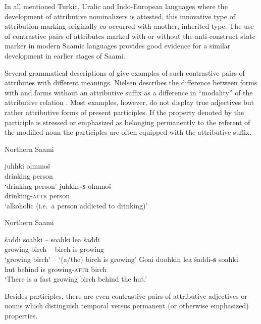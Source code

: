 {In all mentioned Turkic, Uralic and Indo-European languages where the development of attributive nominalizers is attested, this innovative type of attribution marking originally co-occurred with another, inherited type. The use of contrastive pairs of attributes marked with or without the anti-construct state marker in modern Saamic languages provides good evidence for a similar development in earlier stages of Saami.

Several grammatical descriptions of  give examples of such contrastive pairs of attributes with different meanings. Nielsen describes the difference between forms with and forms without an attributive suffix as a difference in “modality” of the attributive relation \cite[203]{nielsen1945b}. Most examples, however, do not display true adjectives but rather attributive forms of present participles. If the property denoted by the participle is stressed or emphasized as belonging permanently to the referent of the modified noun the participles are often equipped with the attributive suffix.
\begin{exe}
\ex
\begin{xlist}
\ex \rm{Northern Saami \citep[204]{nielsen1945b}}
\begin{xlist}
\ex
\gll 	juhhki olmmoš\\
	drinking person\\
\glt	 ‘drinking person’
\ex	
\gll	juhkke\textbf{-s} olmmoš\\
	drinking-\textsc{attr} person\\
\glt	‘alkoholic (i.e.~a person addicted to drinking)’
\end{xlist}
\ex \rm{Northern Saami \citep[282]{bartens1989}}
\begin{xlist}
\ex 	
\gll	šaddi soahki – soahki lea šaddi\\
 	growing birch – birch is growing\\
\glt	‘growing birch’ – ‘(a/the) birch is growing’
\ex
\gll	Goa{\dj}i duohkin lea šaddi\textbf{-s} soahki.\\
	hut behind is growing-\textsc{attr} birch\\
\glt	‘There is a fast growing birch behind the hut.’
\end{xlist}
\end{xlist}
\end{exe}
Besides participles, there are even contrastive pairs of attributive adjectives or nouns which distinguish temporal versus permanent (or otherwise emphasized) properties.
}
